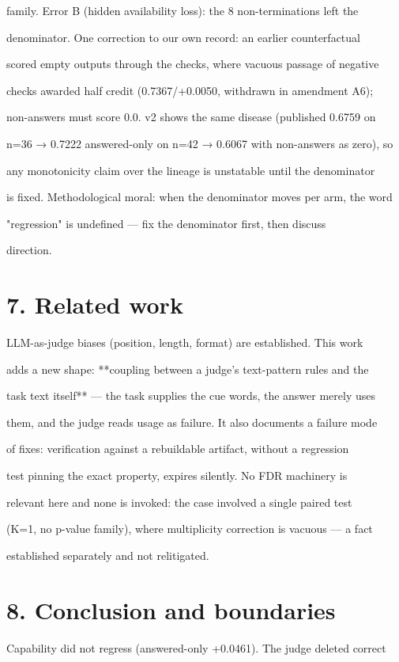 \documentclass[11pt,a4paper]{article}
\begin{document}
family. Error B (hidden availability loss): the 8 non-terminations left the

denominator. One correction to our own record: an earlier counterfactual

scored empty outputs through the checks, where vacuous passage of negative

checks awarded half credit (0.7367/+0.0050, withdrawn in amendment A6);

non-answers must score 0.0. v2 shows the same disease (published 0.6759 on

n=36 → 0.7222 answered-only on n=42 → 0.6067 with non-answers as zero), so

any monotonicity claim over the lineage is unstatable until the denominator

is fixed. Methodological moral: when the denominator moves per arm, the word

"regression" is undefined — fix the denominator first, then discuss

direction.

\section*{7. Related work}
LLM-as-judge biases (position, length, format) are established. This work

adds a new shape: **coupling between a judge's text-pattern rules and the

task text itself** — the task supplies the cue words, the answer merely uses

them, and the judge reads usage as failure. It also documents a failure mode

of fixes: verification against a rebuildable artifact, without a regression

test pinning the exact property, expires silently. No FDR machinery is

relevant here and none is invoked: the case involved a single paired test

(K=1, no p-value family), where multiplicity correction is vacuous — a fact

established separately and not relitigated.

\section*{8. Conclusion and boundaries}
Capability did not regress (answered-only +0.0461). The judge deleted correct
\end{document}
